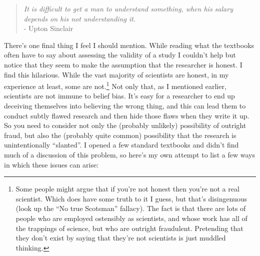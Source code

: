 \documentclass[
  letterpaper,
]{book}
\begin{document}
\begin{quote}
\emph{It is difficult to get a man to understand something, when his
salary depends on his not understanding it.}\\
- Upton Sinclair
\end{quote}

There's one final thing I feel I should mention. While reading what the
textbooks often have to say about assessing the validity of a study I
couldn't help but notice that they seem to make the assumption that the
researcher is honest. I find this hilarious. While the vast majority of
scientists are honest, in my experience at least, some are
not.\footnote{Some people might argue that if you're not honest then
  you're not a real scientist. Which does have some truth to it I guess,
  but that's disingenuous (look up the ``No true Scotsman'' fallacy).
  The fact is that there are lots of people who are employed ostensibly
  as scientists, and whose work has all of the trappings of science, but
  who are outright fraudulent. Pretending that they don't exist by
  saying that they're not scientists is just muddled thinking.} Not only
that, as I mentioned earlier, scientists are not immune to belief bias.
It's easy for a researcher to end up deceiving themselves into believing
the wrong thing, and this can lead them to conduct subtly flawed
research and then hide those flaws when they write it up. So you need to
consider not only the (probably unlikely) possibility of outright fraud,
but also the (probably quite common) possibility that the research is
unintentionally ``slanted''. I opened a few standard textbooks and
didn't find much of a discussion of this problem, so here's my own
attempt to list a few ways in which these issues can arise:
\end{document}
